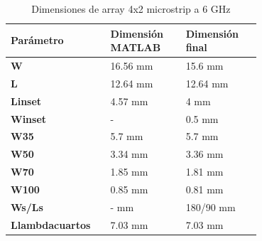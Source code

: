 \begin{table}[H]
  

   \small %
   \centering %
   \begin{tabular}{m{0.2\linewidth}m{0.25\linewidth}m{0.25\linewidth}} %
   \toprule[\heavyrulewidth]\toprule[\heavyrulewidth]
   \textbf{Parámetro} & \textbf{Dimensión MATLAB} & \textbf{Dimensión final} \\ 
   \midrule
    \textbf{W} & 16.56 mm & 15.6 mm \\
   \textbf{L} & 12.64 mm & 12.64 mm\\
   \textbf{Linset} & 4.57 mm & 4 mm\\
   \textbf{Winset} & - & 0.5 mm\\
   \textbf{W35} & 5.7 mm & 5.7 mm\\
   \textbf{W50} & 3.34 mm & 3.36 mm\\
   \textbf{W70} & 1.85 mm & 1.81 mm\\
   \textbf{W100} & 0.85 mm & 0.81 mm\\
   \textbf{Ws/Ls} & - mm & 180/90 mm\\
   \textbf{Llambdacuartos} & 7.03 mm & 7.03 mm\\
   \bottomrule[\heavyrulewidth] 
   \end{tabular}
   \caption{Dimensiones de array 4x2 microstrip a 6 GHz} 
      \label{tab:array4x22}
\end{table}




